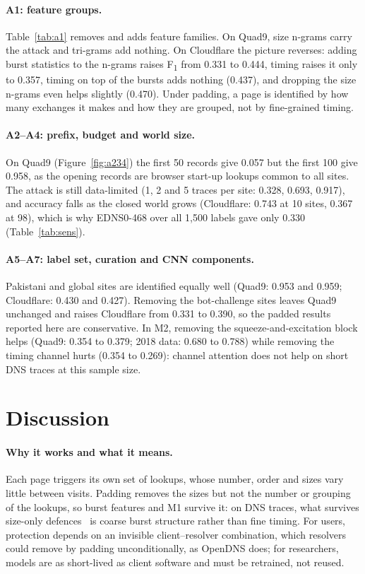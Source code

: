 \documentclass[pdflatex,sn-mathphys-num]{sn-jnl}
\newcommand{\Fone}{F\textsubscript{1}}
\begin{document}
\paragraph{A1: feature groups.} Table~\ref{tab:a1} removes and adds feature families. On Quad9, size n-grams carry the attack and tri-grams add nothing. On Cloudflare the picture reverses: adding burst statistics to the n-grams raises \Fone{} from 0.331 to 0.444, timing raises it only to 0.357, timing on top of the bursts adds nothing (0.437), and dropping the size n-grams even helps slightly (0.470). Under padding, a page is identified by how many exchanges it makes and how they are grouped, not by fine-grained timing.

\paragraph{A2--A4: prefix, budget and world size.} On Quad9 (Figure~\ref{fig:a234}) the first 50 records give 0.057 but the first 100 give 0.958, as the opening records are browser start-up lookups common to all sites. The attack is still data-limited (1, 2 and 5 traces per site: 0.328, 0.693, 0.917), and accuracy falls as the closed world grows (Cloudflare: 0.743 at 10 sites, 0.367 at 98), which is why EDNS0-468 over all 1,500 labels gave only 0.330 (Table~\ref{tab:sens}).

\paragraph{A5--A7: label set, curation and CNN components.} Pakistani and global sites are identified equally well (Quad9: 0.953 and 0.959; Cloudflare: 0.430 and 0.427). Removing the bot-challenge sites leaves Quad9 unchanged and raises Cloudflare from 0.331 to 0.390, so the padded results reported here are conservative. In M2, removing the squeeze-and-excitation block helps (Quad9: 0.354 to 0.379; 2018 data: 0.680 to 0.788) while removing the timing channel hurts (0.354 to 0.269): channel attention does not help on short DNS traces at this sample size.

\section{Discussion}\label{sec:discussion}

\paragraph{Why it works and what it means.} Each page triggers its own set of lookups, whose number, order and sizes vary little between visits. Padding removes the sizes but not the number or grouping of the lookups, so burst features and M1 survive it: on DNS traces, what survives size-only defences~\cite{gong2026wfcat,bushart2020} is coarse burst structure rather than fine timing. For users, protection depends on an invisible client--resolver combination, which resolvers could remove by padding unconditionally, as OpenDNS does; for researchers, models are as short-lived as client software and must be retrained, not reused.
\end{document}
